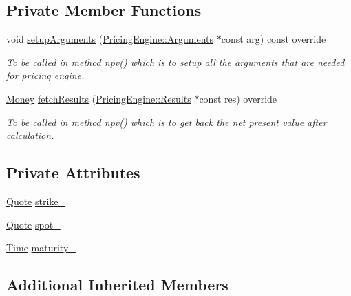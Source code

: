 \subsection*{Private Member Functions}
\begin{DoxyCompactItemize}
\item 
void \hyperlink{class_forward_a909ab0cefa0ab42bdaf3bf6e84ac0096}{setup\+Arguments} (\hyperlink{class_pricing_engine_1_1_arguments}{Pricing\+Engine\+::\+Arguments} $\ast$const arg) const override
\begin{DoxyCompactList}\small\item\em To be called in method \hyperlink{class_instrument_aa750f2ae95a21d65a073da3171e8d084}{npv()} which is to setup all the arguments that are needed for pricing engine. \end{DoxyCompactList}\item 
\hyperlink{_name_def_8h_a5a9d48c16a694e9a2d9f1eca730dc8c5}{Money} \hyperlink{class_forward_ab1e2edeb8345c8605013634a598d1ae5}{fetch\+Results} (\hyperlink{class_pricing_engine_1_1_results}{Pricing\+Engine\+::\+Results} $\ast$const res) override
\begin{DoxyCompactList}\small\item\em To be called in method \hyperlink{class_instrument_aa750f2ae95a21d65a073da3171e8d084}{npv()} which is to get back the net present value after calculation. \end{DoxyCompactList}\end{DoxyCompactItemize}
\subsection*{Private Attributes}
\begin{DoxyCompactItemize}
\item 
\hyperlink{_name_def_8h_a642a6c5fd87319d922637de0e0bb0305}{Quote} \hyperlink{class_forward_a17c32d0a673c13fd92288b1720a43b76}{strike\+\_\+}
\item 
\hyperlink{_name_def_8h_a642a6c5fd87319d922637de0e0bb0305}{Quote} \hyperlink{class_forward_a362d0396ceda462e504f77120339f8b0}{spot\+\_\+}
\item 
\hyperlink{_name_def_8h_ac2d3e0ba793497bcca555c7c2cf64ff3}{Time} \hyperlink{class_forward_ad599104a13c33fbf31e9214af904e9aa}{maturity\+\_\+}
\end{DoxyCompactItemize}
\subsection*{Additional Inherited Members}


